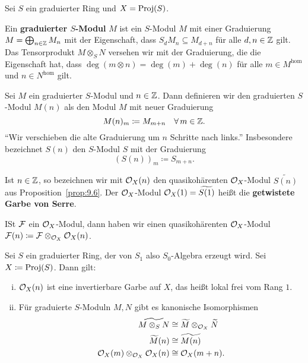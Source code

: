 \begin{defn}
\label{defn:11.11}
	Sei $S$ ein graduierter Ring und $X = \operatorname{Proj}(S)$.
	\item Ein \textbf{graduierter $S$-Modul} $M$ ist ein $S$-Modul $M$ mit einer Graduierung $M=\bigoplus_{n\in \mathbb {Z}}M_n$ mit der Eigenschaft, dass $S_dM_n \subseteq M_{d+n}$ für alle $d,n  \in \mathbb {Z}$ gilt. Das Tensorprodukt $M\otimes_S N$ versehen wir mit der Graduierung, die die Eigenschaft hat, dass $\deg(m\otimes n) = \deg(m)+\deg(n)$ für alle $m \in M^\text{hom}$ und $n \in N^\text{hom}$ gilt.
	\item Sei $M$ ein graduierter $S$-Modul und $n \in \mathbb {Z}$. Dann definieren wir den graduierten $S$-Modul $M(n)$ als den Modul $M$ mit neuer Graduierung
	\[
		M(n)_m \coloneqq M_{m+n} \quad \forall\, m \in \mathbb {Z}.
	\]
	\enquote{Wir verschieben die alte Graduierung um $n$ Schritte nach links.} Insbesondere bezeichnet $S(n)$ den $S$-Modul $S$ mit der Graduierung
	\[
		(S(n))_m\coloneqq S_{m+n}.
	\]
	\item Ist $n \in \mathbb {Z}$, so bezeichnen wir mit $\mathcal{O}_X(n)$ den quasikohärenten $\mathcal{O}_X$-Modul $\widetilde{S(n)}$ aus Proposition~\ref{prop:9.6}. Der $\mathcal{O}_X$-Modul $\mathcal{O}_X(1) = \widetilde{S(1)}$ heißt die \textbf{getwistete Garbe von Serre}.
	\item ISt $\mathcal{F}$ ein $\mathcal{O}_X$-Modul, dann haben wir einen quasikohärenten $\mathcal{O}_X$-Modul $\mathcal{F}(n)\coloneqq \mathcal{F} \otimes_{\mathcal{O}_X}\mathcal{O}_X(n)$.
\end{defn}

\begin{prop}
\label{prop:11.12}
	Sei $S$ ein graduierter Ring, der von $S_1$ also $S_0$-Algebra erzeugt wird. Sei $X\coloneqq \operatorname{Proj}(S)$. Dann gilt:
	\begin{enumerate}[i)]
		\item $\mathcal{O}_X(n)$ ist eine invertierbare Garbe auf $X$, das heißt lokal frei vom Rang $1$.
		\item Für graduierte $S$-Moduln $M,N$ gibt es kanonische Isomorphismen
		\begin{align*}
			\widetilde{M\otimes_S N} & \cong \widetilde{M}\otimes_{\mathcal{O}_X} \widetilde{N}\\
			\widetilde{M}(n) & \cong \widetilde{M(n)}\\
			\mathcal{O}_X(m)\otimes_{\mathcal{O}_X} \mathcal{O}_X(n) &\cong \mathcal{O}_X(m+n).
		\end{align*}
	\end{enumerate}
\end{prop}


